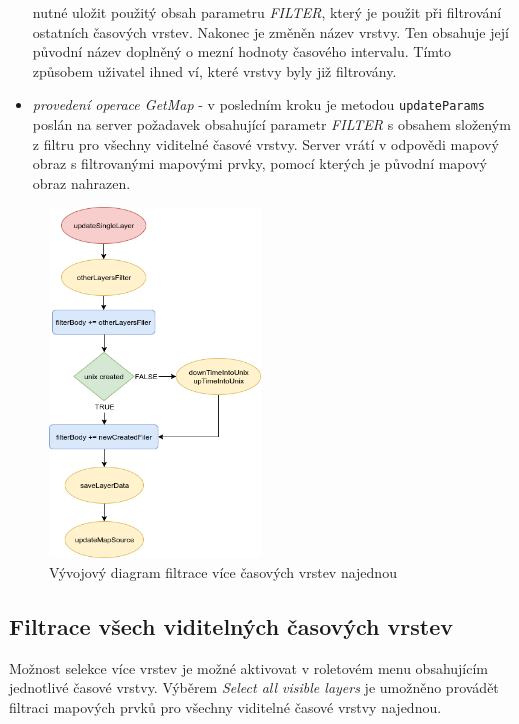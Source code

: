 \begin{itemize}
nutné uložit použitý obsah parametru \textit{FILTER}, který
je použit při filtrování ostatních časových vrstev. Nakonec
je změněn název vrstvy. Ten obsahuje její původní název doplněný o
mezní hodnoty časového intervalu. Tímto způsobem uživatel ihned
ví, které vrstvy byly již filtrovány.
\item\textit{provedení operace GetMap} - v posledním kroku je
metodou \verb|updateParams| poslán na server požadavek obsahující
parametr \textit{FILTER} s obsahem složeným z filtru pro všechny
viditelné časové vrstvy. Server vrátí v odpovědi mapový obraz s
filtrovanými mapovými prvky, pomocí kterých je původní mapový
obraz nahrazen.
\end{itemize}

\begin{figure}[h!]
\centering
\includegraphics[width=0.5\textwidth]{./img/getSingleLayer.png}
\caption{Vývojový diagram filtrace více časových vrstev najednou
	\cite{flow-chart}}
\label{fig:single-chart}
\end{figure}

\subsection{Filtrace všech viditelných časových vrstev}
\label{sssec:multiple-layers-filtration}

Možnost selekce více vrstev je možné aktivovat v roletovém menu
obsahujícím jednotlivé časové vrstvy. Výběrem \textit{Select all
visible layers} je umožněno provádět filtraci mapových prvků pro
všechny viditelné časové vrstvy najednou.

